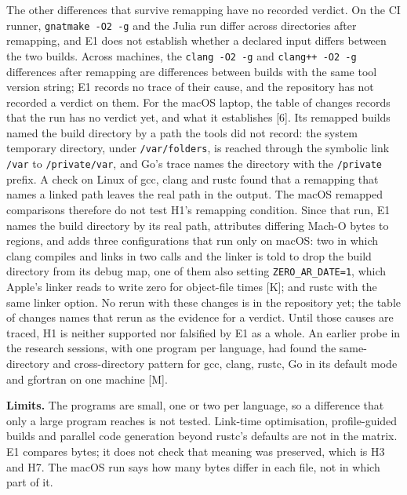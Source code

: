 \documentclass[10pt,letterpaper]{article}
\begin{document}
The other differences that survive remapping have no recorded verdict.
On the CI runner, \texttt{gnatmake\ -\allowbreak{}O2\ -\allowbreak{}g} and the Julia run differ
across directories after remapping, and E1 does not establish whether a
declared input differs between the two builds. Across machines, the
\texttt{clang\ -\allowbreak{}O2\ -\allowbreak{}g} and \texttt{clang++\ -\allowbreak{}O2\ -\allowbreak{}g} differences after
remapping are differences between builds with the same tool version
string; E1 records no trace of their cause, and the repository has not
recorded a verdict on them. For the macOS laptop, the table of changes
records that the run has no verdict yet, and what it establishes
{[}6{]}. Its remapped builds named the build directory by a path the
tools did not record: the system temporary directory, under
\texttt{/\allowbreak{}var/\allowbreak{}folders}, is reached through the symbolic link
\texttt{/var} to \texttt{/\allowbreak{}private/\allowbreak{}var}, and Go's trace names the
directory with the \texttt{/private} prefix. A check on Linux of gcc,
clang and rustc found that a remapping that names a linked path leaves
the real path in the output. The macOS remapped comparisons therefore do
not test H1's remapping condition. Since that run, E1 names the build
directory by its real path, attributes differing Mach-O bytes to
regions, and adds three configurations that run only on macOS: two in
which clang compiles and links in two calls and the linker is told to
drop the build directory from its debug map, one of them also setting
\texttt{ZERO\_\allowbreak{}AR\_\allowbreak{}DATE=1}, which Apple's linker reads to write zero for
object-file times {[}K{]}; and rustc with the same linker option. No
rerun with these changes is in the repository yet; the table of changes
names that rerun as the evidence for a verdict. Until those causes are
traced, H1 is neither supported nor falsified by E1 as a whole. An
earlier probe in the research sessions, with one program per language,
had found the same-directory and cross-directory pattern for gcc, clang,
rustc, Go in its default mode and gfortran on one machine {[}M{]}.

\textbf{Limits.} The programs are small, one or two per language, so a
difference that only a large program reaches is not tested. Link-time
optimisation, profile-guided builds and parallel code generation beyond
rustc's defaults are not in the matrix. E1 compares bytes; it does not
check that meaning was preserved, which is H3 and H7. The macOS run says
how many bytes differ in each file, not in which part of it.
\end{document}
